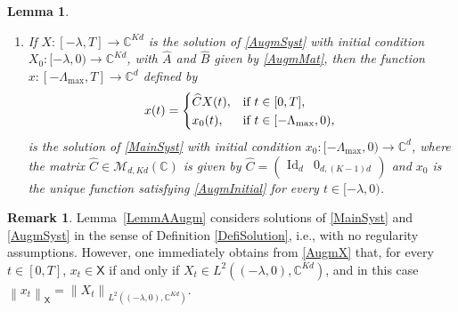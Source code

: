 \documentclass[10pt]{article}
\newcommand{\ie}{i.e.,\xspace}
\newcommand{\llbracket}{[\![}
\newcommand{\rrbracket}{]\!]}
\theoremstyle{plain}
\newtheorem{lemm}[theo]{Lemma}
\theoremstyle{definition}
\newtheorem{remk}[theo]{Remark}
\DeclareMathOperator{\id}{Id}
\newcommand{\norm}[1]{\left\lVert #1\right\lVert}
\numberwithin{equation}{section}\numberwithin{figure}{section}\emergencystretch=3em
\begin{document}
\begin{lemm}
\begin{enumerate}
\begin{equation}
\begin{aligned}
&\hspace*{2cm}\text{(in particular, $\widehat A_k = 0$ if $k_j \neq k$ for all $j \in \llbracket 1, N\rrbracket$)},
\end{aligned}
\end{equation}
and with initial condition $X_0: [-\lambda, 0) \to \mathbb C^{K d}$ given by
\begin{equation}
\label{AugmInitial}
X_0(t) = \begin{pmatrix}
x_0(t) \\
x_0(t - \lambda) \\
x_0(t - 2\lambda) \\
\vdots \\
x_0(t - (K-1)\lambda) \\
\end{pmatrix}.
\end{equation}

\item If $X: [-\lambda, T] \to \mathbb C^{K d}$ is the solution of \eqref{AugmSyst} with initial condition $X_0: [-\lambda, 0) \to \mathbb C^{K d}$, with $\widehat A$ and $\widehat B$ given by \eqref{AugmMat}, then the function $x: [-\Lambda_{\max}, T] \to \mathbb C^d$ defined by
\[
x(t) =
\begin{dcases*}
\widehat C X(t), & if $t \in [0, T]$, \\
x_0(t), & if $t \in [-\Lambda_{\max}, 0)$,
\end{dcases*}
\]
is the solution of \eqref{MainSyst} with initial condition $x_0: [-\Lambda_{\max}, 0) \to \mathbb C^d$, where the matrix $\widehat C \in \mathcal M_{d, K d}(\mathbb C)$ is given by $\widehat C = \begin{pmatrix}\id_d & 0_{d, (K-1)d}\end{pmatrix}$ and $x_0$ is the unique function satisfying \eqref{AugmInitial} for every $t \in [-\lambda, 0)$.
\end{enumerate}
\end{lemm}

\begin{remk}
Lemma~\ref{LemmAAugm} considers solutions of \eqref{MainSyst} and \eqref{AugmSyst} in the sense of Definition \ref{DefiSolution}, \ie with no regularity assumptions. However, one immediately obtains from \eqref{AugmX} that, for every $t \in [0, T]$, $x_t \in \mathsf X$ if and only if $X_t \in L^2((-\lambda, 0), \mathbb C^{Kd})$, and in this case $\norm{x_t}_{\mathsf X} = \norm{X_t}_{L^2((-\lambda, 0), \mathbb C^{Kd})}$.
\end{remk}
\end{document}

